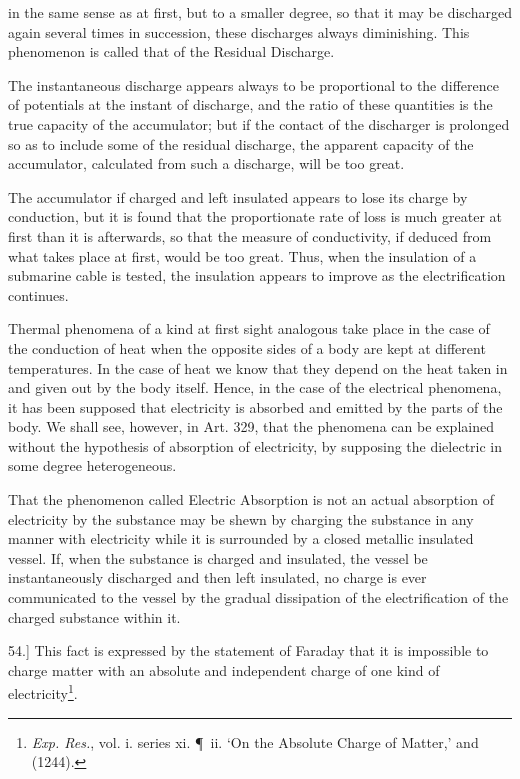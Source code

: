 \documentclass[11pt,a4paper]{article}
\begin{document}
in the same sense as at first, but to a smaller degree, so that it may
be discharged again several times in succession, these discharges
always diminishing. This phenomenon is called that of the Residual
Discharge.

The instantaneous discharge appears always to be proportional
to the difference of potentials at the instant of discharge, and the
ratio of these quantities is the true capacity of the accumulator;
but if the contact of the discharger is prolonged so as to include
some of the residual discharge, the apparent capacity of the
accumulator, calculated from such a discharge, will be too great.

The accumulator if charged and left insulated appears to lose its
charge by conduction, but it is found that the proportionate rate
of loss is much greater at first than it is afterwards, so that the
measure of conductivity, if deduced from what takes place at first,
would be too great. Thus, when the insulation of a submarine
cable is tested, the insulation appears to improve as the
electrification continues.

Thermal phenomena of a kind at first sight analogous take place
in the case of the conduction of heat when the opposite sides of a
body are kept at different temperatures. In the case of heat we
know that they depend on the heat taken in and given out by the
body itself. Hence, in the case of the electrical phenomena, it
has been supposed that electricity is absorbed and emitted by the
parts of the body. We shall see, however, in Art. 329, that the
phenomena can be explained without the hypothesis of absorption of
electricity, by supposing the dielectric in some degree heterogeneous.

That the phenomenon called Electric Absorption is not an
actual absorption of electricity by the substance may be shewn by
charging the substance in any manner with electricity while it is
surrounded by a closed metallic insulated vessel. If, when the
substance is charged and insulated, the vessel be instantaneously
discharged and then left insulated, no charge is ever communicated
to the vessel by the gradual dissipation of the electrification of the
charged substance within it.

54.] This fact is expressed by the statement of Faraday that
it is impossible to charge matter with an absolute and independent
charge of one kind of electricity\footnote{\textit{Exp. Res.}, vol. i.
series xi. \P\ ii. `On the Absolute Charge of Matter,' and (1244).}.
\end{document}
